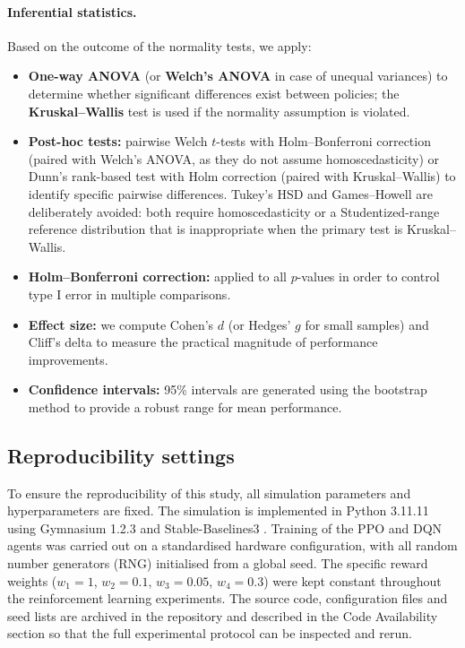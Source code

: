 \documentclass[11pt,a4paper]{article}
\begin{document}
\paragraph{Inferential statistics.} Based on the outcome of the normality tests, we apply:

\begin{itemize}
  \item \textbf{One-way ANOVA} (or \textbf{Welch's ANOVA} in case of unequal variances) to determine whether significant differences exist between policies; the \textbf{Kruskal--Wallis} test is used if the normality assumption is violated.
  \item \textbf{Post-hoc tests:} pairwise Welch $t$-tests with Holm--Bonferroni correction (paired with Welch's ANOVA, as they do not assume homoscedasticity) or Dunn's rank-based test with Holm correction (paired with Kruskal--Wallis) to identify specific pairwise differences. Tukey's HSD and Games--Howell are deliberately avoided: both require homoscedasticity or a Studentized-range reference distribution that is inappropriate when the primary test is Kruskal--Wallis.
  \item \textbf{Holm--Bonferroni correction:} applied to all $p$-values in order to control type I error in multiple comparisons.
  \item \textbf{Effect size:} we compute Cohen's $d$ (or Hedges' $g$ for small samples) and Cliff's delta to measure the practical magnitude of performance improvements.
  \item \textbf{Confidence intervals:} 95\% intervals are generated using the bootstrap method to provide a robust range for mean performance.
\end{itemize}

\subsection{Reproducibility settings}

To ensure the reproducibility of this study, all simulation parameters and hyperparameters are fixed. The simulation is implemented in Python 3.11.11 using Gymnasium 1.2.3 \cite{MarkTowers2025} and Stable-Baselines3 \cite{AntoninRaffin2021}. Training of the PPO and DQN agents was carried out on a standardised hardware configuration, with all random number generators (RNG) initialised from a global seed. The specific reward weights ($w_1 = 1$, $w_2 = 0.1$, $w_3 = 0.05$, $w_4 = 0.3$) were kept constant throughout the reinforcement learning experiments. The source code, configuration files and seed lists are archived in the repository and described in the Code Availability section so that the full experimental protocol can be inspected and rerun.
\end{document}

